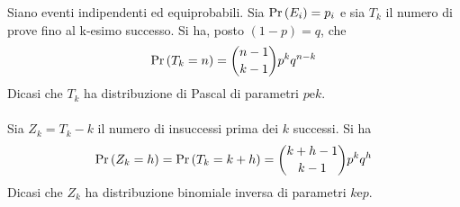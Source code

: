 \documentclass{subfiles}
\begin{document}
Siano  eventi indipendenti ed equiprobabili. Sia $\Prob{E_{i}} = p_{i}$ e sia $T_{k}$ il numero di prove fino al k-esimo successo.
Si ha, posto $(1 - p) = q$, che
$$
    \Prob{T_{k} = n} = \binom{n - 1}{k - 1} p^{k} q^{n -k}
$$
Dicasi che $T_{k}$ ha distribuzione di Pascal di parametri $p \text{e} k$.
\\ \\
Sia $Z_{k} = T_{k} - k$ il numero di insuccessi prima dei $k$ successi. Si ha
$$
    \Prob{Z_{k} = h} = \Prob{T_{k} = k + h} = \binom{k + h - 1}{k - 1} p^{k}q^{h}
$$
Dicasi che $Z_{k}$ ha distribuzione binomiale inversa di parametri $k \text{e} p$.
\end{document}

